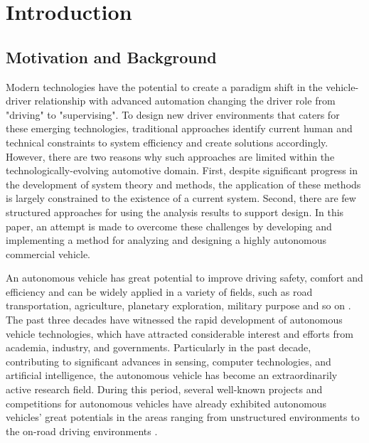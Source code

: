 \chapter{Introduction}


\section{Motivation and Background}


Modern technologies have the potential to create a paradigm shift in the vehicle-driver relationship with advanced automation changing the driver role from "driving" to "supervising". To design new driver environments that caters for these emerging technologies, traditional approaches identify current human and technical constraints to system efficiency and create solutions accordingly. However, there are two reasons why such approaches are limited within the technologically-evolving automotive domain. First, despite significant progress in the development of system theory and methods, the application of these methods is largely constrained to the existence of a current system. Second, there are few structured approaches for using the analysis results to support design. In this paper, an attempt is made to overcome these challenges by developing and implementing a method for analyzing and designing a highly autonomous commercial vehicle. 

An autonomous vehicle has great potential to improve driving safety, comfort and efficiency and can be widely applied in a variety of fields, such as road transportation, agriculture, planetary exploration, military purpose and so on \cite {WANG2015727}. The past three decades have witnessed the rapid development of autonomous vehicle technologies, which have attracted considerable interest and efforts from academia, industry, and governments. Particularly in the past decade, contributing to significant advances in sensing, computer technologies, and artificial intelligence, the autonomous vehicle has become an extraordinarily active research field. During this period, several well-known projects and competitions for autonomous vehicles have already exhibited autonomous vehicles' great potentials in the areas ranging from unstructured environments to the on-road driving environments \cite{AutonomousStructured} \cite{DrivingUrban2008}.


